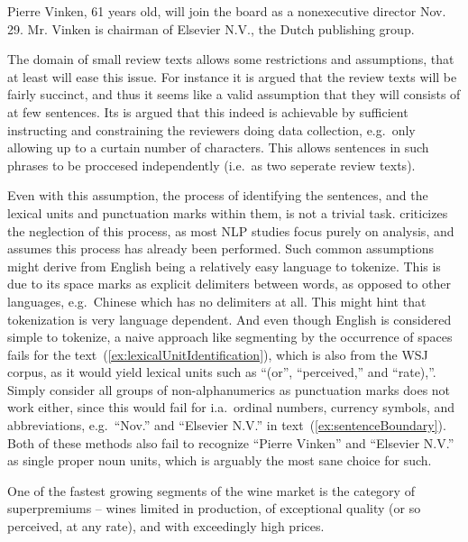 \begin{numquote}
  Pierre Vinken, 61 years old, will join the board as a nonexecutive director Nov. 29. Mr. Vinken is chairman of Elsevier N.V., the Dutch publishing group.  
  \label{ex:sentenceBoundary}
\end{numquote}

The domain of small review texts allows some restrictions and assumptions, that at least will ease this issue. For instance it is argued that the review texts will be fairly succinct, and thus it seems like a valid assumption that they will consists of at few sentences. Its is argued that this indeed is achievable by sufficient instructing and constraining the reviewers doing data collection, e.g.\ only allowing up to a curtain number of characters. This allows sentences in such phrases to be proccesed independently (i.e.\ as two seperate review texts).

Even with this assumption, the process of identifying the sentences, and the lexical units and punctuation marks within them, is not a trivial task. \citeauthor{tokenization}  criticizes the neglection of this process, as most NLP studies focus purely on analysis, and assumes this process has already been performed. Such common assumptions might derive from English being a relatively easy language to tokenize. This is due to its space marks as explicit delimiters between words, as opposed to other languages, e.g.\ Chinese which has no delimiters at all. This might hint that tokenization is very language dependent. And even though English is considered simple to tokenize, a naive approach like segmenting by the occurrence of spaces fails for the text~(\ref{ex:lexicalUnitIdentification}), which is also from the WSJ corpus, as it would yield lexical units such as ``(or'', ``perceived,'' and ``rate),''. Simply consider all groups of non-alphanumerics as punctuation marks does not work either, since this would fail for i.a.\ ordinal numbers, currency symbols, and abbreviations, e.g.\ ``Nov.'' and ``Elsevier N.V.'' in text~(\ref{ex:sentenceBoundary}). Both of these methods also fail to recognize ``Pierre Vinken'' and ``Elsevier N.V.'' as single proper noun units, which is arguably the most sane choice for such. 

\begin{numquote}
One of the fastest growing segments of the wine market is the category of superpremiums -- wines limited in production, of exceptional quality (or so perceived, at any rate), and with exceedingly high prices.
  \label{ex:lexicalUnitIdentification}
\end{numquote}
\clearpage

